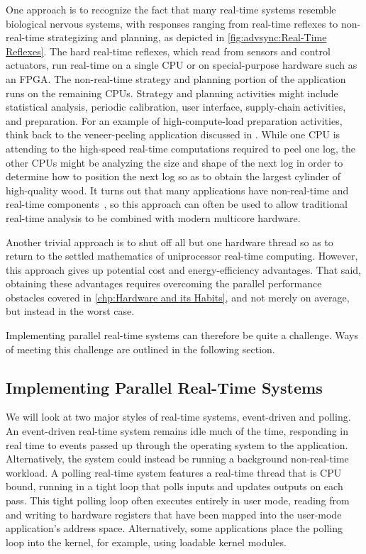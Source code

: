 One approach is to recognize the fact that many real-time systems
resemble biological nervous systems, with responses ranging from
real-time reflexes to non-real-time strategizing and planning,
as depicted in
\cref{fig:advsync:Real-Time Reflexes}.
The hard real-time reflexes, which read from sensors and control
actuators, run real-time on a single CPU or on special-purpose hardware
such as an FPGA.
The non-real-time strategy and planning portion of the application runs
on the remaining CPUs.
Strategy and planning activities might include statistical analysis,
periodic calibration, user interface, supply-chain activities, and
preparation.
For an example of high-compute-load preparation activities, think back
to the veneer-peeling application discussed in
.
While one CPU is attending to the high-speed real-time computations
required to peel one log, the other CPUs might be analyzing the size
and shape of the next log in order to determine how to position the
next log so as to obtain the largest cylinder of high-quality wood.
It turns out that many applications have non-real-time and real-time
components~\cite{RobertBerry2008IBMSysJ}, so this approach can
often be used to allow traditional real-time analysis to be combined
with modern multicore hardware.

Another trivial approach is to shut off all but one hardware thread so as
to return to the settled mathematics of uniprocessor real-time
computing.
However, this approach gives up potential cost and energy-efficiency
advantages.
That said, obtaining these advantages requires overcoming the parallel
performance obstacles covered in
\cref{chp:Hardware and its Habits},
and not merely on average, but instead in the worst case.

Implementing parallel real-time systems can therefore be quite a
challenge.
Ways of meeting this challenge are outlined in the following section.

\subsection{Implementing Parallel Real-Time Systems}
\label{sec:advsync:Implementing Parallel Real-Time Systems}

We will look at two major styles of real-time systems, event-driven and
polling.
An event-driven real-time system remains idle much of the time, responding
in real time to events passed up through the operating system to the
application.
Alternatively, the system could instead be running a background
non-real-time workload.
A polling real-time system features a real-time thread that is CPU
bound, running in a tight loop that polls inputs and updates outputs on
each pass.
This tight polling loop often executes entirely in user mode, reading from
and writing to hardware registers that have been mapped into the user-mode
application's address space.
Alternatively, some applications place the polling loop into the kernel,
for example, using loadable kernel modules.


